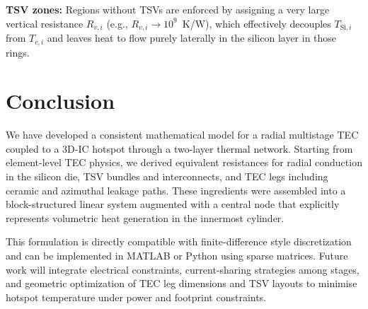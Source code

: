 \documentclass[conference]{IEEEtran}
\begin{document}
	\textbf{TSV zones:} Regions without TSVs are enforced by assigning a very large vertical resistance $R_{v,i}$ (e.g., $R_{v,i} \rightarrow 10^9$~\si{K/W}), which effectively decouples $T_{\text{Si},i}$ from $T_{c,i}$ and leaves heat to flow purely laterally in the silicon layer in those rings.

\section{Conclusion}

We have developed a consistent mathematical model for a radial multistage TEC coupled to a 3D-IC hotspot through a two-layer thermal network. Starting from element-level TEC physics, we derived equivalent resistances for radial conduction in the silicon die, TSV bundles and interconnects, and TEC legs including ceramic and azimuthal leakage paths. These ingredients were assembled into a block-structured linear system augmented with a central node that explicitly represents volumetric heat generation in the innermost cylinder.

This formulation is directly compatible with finite-difference style discretization and can be implemented in MATLAB or Python using sparse matrices. Future work will integrate electrical constraints, current-sharing strategies among stages, and geometric optimization of TEC leg dimensions and TSV layouts to minimise hotspot temperature under power and footprint constraints.
\end{document}
